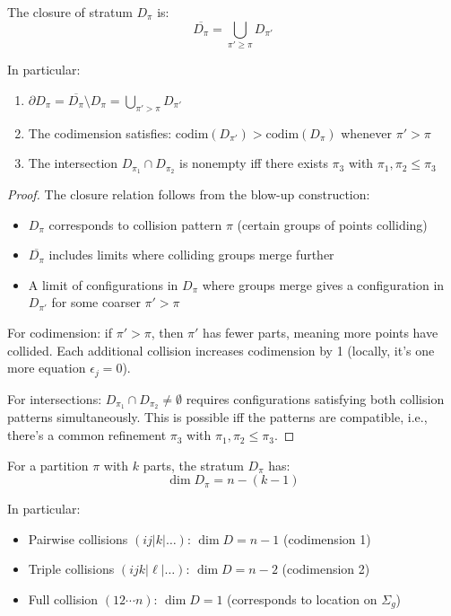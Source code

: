 \begin{theorem}\label{thm:closure-relations}
The closure of stratum $D_\pi$ is:
$$\overline{D_\pi} = \bigcup_{\pi' \geq \pi} D_{\pi'}$$

In particular:
\begin{enumerate}
\item $\partial D_\pi = \overline{D_\pi} \setminus D_\pi = \bigcup_{\pi' > \pi} D_{\pi'}$
\item The codimension satisfies: $\text{codim}(D_{\pi'}) > \text{codim}(D_\pi)$ whenever $\pi' > \pi$
\item The intersection $D_{\pi_1} \cap D_{\pi_2}$ is nonempty iff there exists $\pi_3$ with $\pi_1, \pi_2 \leq \pi_3$
\end{enumerate}
\end{theorem}

\begin{proof}
The closure relation follows from the blow-up construction:
\begin{itemize}
\item $D_\pi$ corresponds to collision pattern $\pi$ (certain groups of points colliding)
\item $\overline{D_\pi}$ includes limits where colliding groups merge further
\item A limit of configurations in $D_\pi$ where groups merge gives a configuration in $D_{\pi'}$ for some coarser $\pi' > \pi$
\end{itemize}

For codimension: if $\pi' > \pi$, then $\pi'$ has fewer parts, meaning more points have collided. Each additional collision increases codimension by 1 (locally, it's one more equation $\epsilon_j = 0$).

For intersections: $D_{\pi_1} \cap D_{\pi_2} \neq \emptyset$ requires configurations satisfying both collision patterns simultaneously. This is possible iff the patterns are compatible, i.e., there's a common refinement $\pi_3$ with $\pi_1, \pi_2 \leq \pi_3$.
\end{proof}

\begin{corollary}\label{cor:dimension-strata}
For a partition $\pi$ with $k$ parts, the stratum $D_\pi$ has:
$$\dim D_\pi = n - (k-1)$$

In particular:
\begin{itemize}
\item Pairwise collisions $(ij|k|\ldots)$: $\dim D = n-1$ (codimension 1)
\item Triple collisions $(ijk|\ell|\ldots)$: $\dim D = n-2$ (codimension 2)
\item Full collision $(12\cdots n)$: $\dim D = 1$ (corresponds to location on $\Sigma_g$)
\end{itemize}
\end{corollary}

